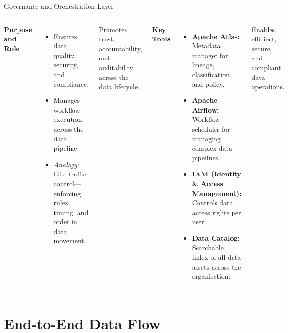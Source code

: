 \documentclass[aspectratio=169, table]{beamer}
\begin{document}
	\begin{frame}[fragile]{Governance and Orchestration Layer}
		\vspace{20pt}
		\begin{columns}[T,onlytextwidth]
			\textbf{Purpose and Role}
			\begin{itemize}
				\item Ensures data quality, security, and compliance.
				\item Manages workflow execution across the data pipeline.
				\item \textit{Analogy:} Like traffic control—enforcing rules, timing, and order in data movement.
			\end{itemize}
			Promotes trust, accountability, and auditability across the data lifecycle.
			
			\textbf{Key Tools}
			\begin{itemize}
				\item \textbf{Apache Atlas:} Metadata manager for lineage, classification, and policy.
				\item \textbf{Apache Airflow:} Workflow scheduler for managing complex data pipelines.
				\item \textbf{IAM (Identity \& Access Management):} Controls data access rights per user.
				\item \textbf{Data Catalog:} Searchable index of all data assets across the organisation.
			\end{itemize}
			Enables efficient, secure, and compliant data operations.
		\end{columns}
	\end{frame}
	
	\section{End-to-End Data Flow}
	
\end{document}
